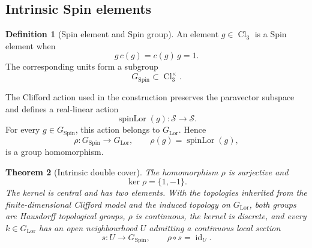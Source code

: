 \documentclass[11pt,a4paper]{article}
\newtheorem{theorem}{Theorem}[section]
\theoremstyle{definition}
\newtheorem{definition}[theorem]{Definition}
\theoremstyle{remark}
\newcommand{\Smodel}{\mathcal{S}}
\newcommand{\Cl}{\operatorname{Cl}}
\newcommand{\SpinG}{G_{\mathrm{Spin}}}
\newcommand{\LorG}{G_{\mathrm{Lor}}}
\newcommand{\id}{\operatorname{id}}
\begin{document}
\subsection{Intrinsic Spin elements}

\begin{definition}[Spin element and Spin group]
\label{def:spingroup}
An element \(g\in\Cl_{3}\) is a Spin element when
\[
    g\,c(g)=c(g)\,g=1.
\tag{3.6}
\]
The corresponding units form a subgroup
\[
    \SpinG\subset\Cl_{3}^{\times}.
\tag{3.7}
\]
\end{definition}

The Clifford action used in the construction preserves the paravector
subspace and defines a real-linear action
\[
   \operatorname{spinLor}(g):\Smodel\longrightarrow\Smodel.
\]
For every \(g\in\SpinG\), this action belongs to \(\LorG\).
Hence
\[
   \rho:\SpinG\longrightarrow\LorG,
   \qquad
   \rho(g)=\operatorname{spinLor}(g),
\tag{3.8}
\]
is a group homomorphism.

\begin{theorem}[Intrinsic double cover]
\label{thm:double-cover}
The homomorphism \(\rho\) is surjective and
\[
   \ker\rho=\{1,-1\}.
\tag{3.9}
\]
The kernel is central and has two elements.  With the topologies inherited
from the finite-dimensional Clifford model and the induced topology on
\(\LorG\), both groups are Hausdorff topological groups, \(\rho\) is
continuous, the kernel is discrete, and every \(k\in\LorG\) has an open
neighbourhood \(U\) admitting a continuous local section
\[
   s:U\longrightarrow\SpinG,
   \qquad
   \rho\circ s=\id_{U}.
\tag{3.10}
\]
\end{theorem}
\end{document}

